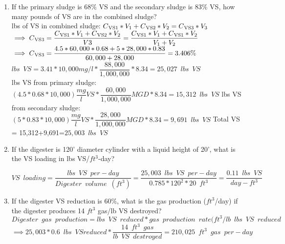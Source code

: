 \begin{enumerate}
\begin{enumerate}
\item If the primary sludge is 68\% VS and the secondary sludge is 83\% VS, how many pounds of VS are in the combined sludge?\\
lbs of VS in combined sludge:
$
C\textsubscript{VS1}*V_1 + C\textsubscript{VS2}*V_2 = C\textsubscript{VS3}*V_3$\\
$\implies C\textsubscript{VS3} = \dfrac{C\textsubscript{VS1}*V_1 + C\textsubscript{VS2}*V_2}{V3}=\dfrac{C\textsubscript{VS1}*V_1 + C\textsubscript{VS1}*V_2}{V_1 + V_2}$\\
$\implies C\textsubscript{VS3}
=\dfrac{4.5*60,000*0.68 + 5*28,000*0.83}{60,000 + 28,000}=3.406\%$\\
$lbs \enspace VS=3.41*10,000 mg/l * \dfrac{88,000}{1,000,000}*8.34=\boxed{25,027 \enspace lbs \enspace VS}$\\


lbs VS from primary sludge: $(4.5*0.68*10,000)\dfrac{mg}{l}VS*\dfrac{60,000}{1,000,000}MGD*8.34=15,312 \enspace lbs \enspace VS$
lbs VS from secondary sludge: $(5*0.83*10,000)\dfrac{mg}{l}VS*\dfrac{28,000}{1,000,000}MGD*8.34=9,691 \enspace lbs \enspace VS$
Total VS = 15,312+9,691=$\boxed{25,003 \enspace lbs \enspace VS}$

\item If the digester is 120’ diameter cylinder with a liquid height of 20’, what is the VS loading in lbs VS/$ft^3$-day?

$VS \enspace loading=\dfrac{lbs \enspace VS \enspace per-day}{Digester \enspace volume \enspace (ft^3)}=\dfrac{25,003 \enspace lbs \enspace VS \enspace per-day}{0.785*120^2*20 \enspace ft^3}=\boxed{\dfrac{0.11 \enspace lbs \enspace VS}{day-ft^3}}$

\item If the digester VS reduction is 60\%, what is the gas production ($ft^3$/day) if the digester produces 14 $ft^3$ gas/lb VS destroyed?\\
$Digester \enspace gas \enspace production = lbs \enspace VS \enspace reduced * gas \enspace production \enspace rate (ft^3/lb \enspace lbs \enspace VS \enspace reduced$
$\implies 25,003*0.6 \enspace lbs \enspace VS reduced*\dfrac{14 \enspace ft^3 \enspace gas}{lb \enspace VS \enspace destroyed}=\boxed{210,025 \enspace ft^3 \enspace gas \enspace per-day}$


\end{enumerate}
\end{enumerate}
